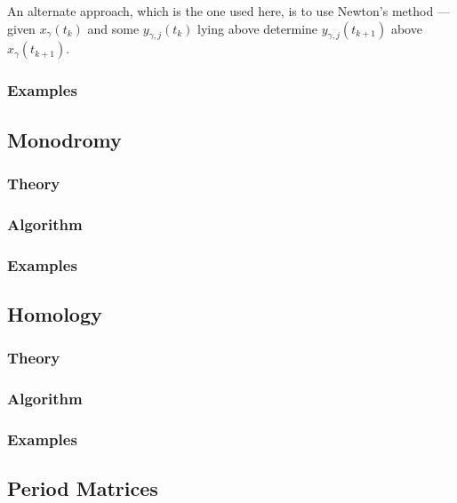 \documentclass[10pt,twoside]{article}
\numberwithin{equation}{section}
\begin{document}
An alternate approach, which is the one used here, is to use Newton's
method --- given $x_\gamma(t_k)$ and some $y_{\gamma,j}(t_k)$ lying
above determine $y_{\gamma,j}(t_{k+1})$ above $x_\gamma(t_{k+1})$.

%
\subsubsection*{Examples}
%

\subsection{Monodromy}

%
\subsubsection*{Theory}
%
%
\subsubsection*{Algorithm}
%
%
\subsubsection*{Examples}
%

\subsection{Homology}

%
\subsubsection*{Theory}
%
%
\subsubsection*{Algorithm}
%
%
\subsubsection*{Examples}
%

\subsection{Period Matrices}
\end{document}
